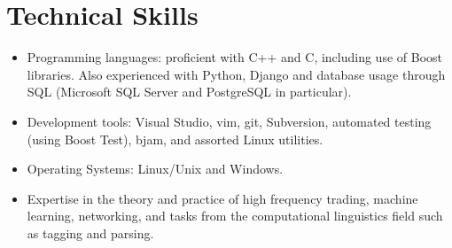 \documentclass[]{article}
\begin{document}
\begin{comment}
\textbf{Most Recent Grades}\\

\begin{table*}[h]
\begin{tabular}[]{p{0.5cm}p{10.3cm}p{3.5cm}l}
& \underline{Honours Year} & \\
&Overall Honours Mark & \textit{First Class}\\
&Honours Thesis & \textit{High Distinction}\\

&Data Mining and Machine Learning & \textit{Distinction}\\

&Statistical Natural Language Processing & \textit{High
  Distinction}\\ 

&IT Research Methods & \textit{High Distinction}\\

&Network-Based High Performance Computing & \textit{Distinction} \\

&Advanced Technologies for Learning & \textit{Distinction}\\

\end{tabular}
\end{table*}
\end{comment}


\section*{Technical Skills}

\begin{itemize}
\item {Programming languages: proficient with C++ and C, including use of Boost libraries.
Also experienced with Python, Django and database usage through SQL (Microsoft SQL Server and PostgreSQL in particular).} 
\item {Development tools: Visual Studio, vim, git, Subversion, automated testing (using Boost Test), bjam, and assorted Linux utilities.}
\item {Operating Systems: Linux/Unix and Windows.}
\item {Expertise in the theory and practice of high frequency trading, machine learning, networking,
and tasks from the computational linguistics field such as tagging and parsing.}
\end{itemize}
\end{document}
